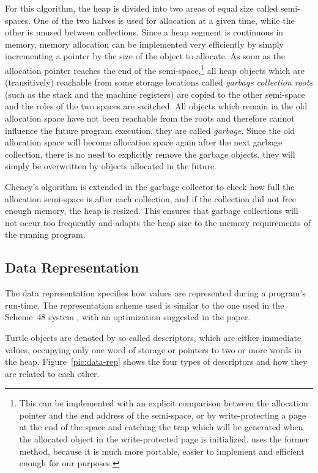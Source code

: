 %
For this algorithm, the heap is divided into two areas of equal size
called semi-spaces.  One of the two halves is used for allocation at a
given time, while the other is unused between collections.  Since a
heap segment is continuous in memory, memory allocation can be
implemented very efficiently by simply incrementing a pointer by the
size of the object to allocate.  As soon as the allocation pointer
reaches the end of the semi-space,\footnote{This can be implemented
  with an explicit comparison between the allocation pointer and the
  end address of the semi-space, or by write-protecting a page at the
  end of the space and catching the trap which will be generated when
  the allocated object in the write-protected page is initialized.
  \turtle{} uses the former method, because it is much more portable,
  easier to implement and efficient enough for our purposes.} all heap
objects which are (transitively) reachable from some storage locations
called {\em garbage collection roots} (such as the stack and the
machine registers) are copied to the other semi-space and the roles of
the two spaces are switched.  All objects which remain in the old
allocation space have not been reachable from the roots and therefore
cannot influence the future program execution, they are called {\em
  garbage}.  Since the old allocation space will become allocation
space again after the next garbage collection, there is no need to
explicitly remove the garbage objects, they will simply be overwritten
by objects allocated in the future.

Cheney's algorithm is extended in the \turtle{} garbage collector to
check how full the allocation semi-space is after each collection, and
if the collection did not free enough memory, the heap is resized.
This ensures that garbage collections will not occur too frequently
and adapts the heap size to the memory requirements of the running
program.


\subsection{Data Representation}  
\label{sec:data-representation}

The data representation specifies how values are represented during a
\turtle{} program's run-time.  The representation scheme used is
similar to the one used in the Scheme~48 system
\cite{kelsey94tractable}, with an optimization suggested in the paper.

Turtle objects are denoted by so-called descriptors, which are either
immediate values, occupying only one word of storage or pointers to
two or more words in the heap.  Figure~\ref{pic:data-rep} shows the
four types of descriptors and how they are related to each other.


